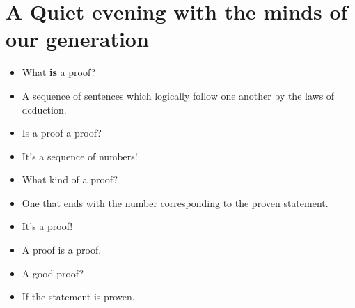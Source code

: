 \def \jean{\texttt{[image: Chretien\_Jean.jpg]}}
\def \godel{\texttt{[image: Godel.jpg]}}
\section{A Quiet evening with the minds of our generation}
\begin{itemize}
  \item[\jean] What \textbf{is} a proof?
  \item[\godel] A sequence of sentences 
    which logically follow one another by the laws 
    of deduction.
  \item[\jean] Is a proof a proof?
  \item[\godel] It's a sequence of numbers!
  \item[\jean] What kind of a proof?
  \item[\godel] One that ends with the number corresponding to 
    the proven statement.
  \item[\jean] It's a proof!
  \item[\godel] A proof is a proof.
  \item[\jean] A good proof?
  \item[\godel] If the statement is proven.
\end{itemize}

